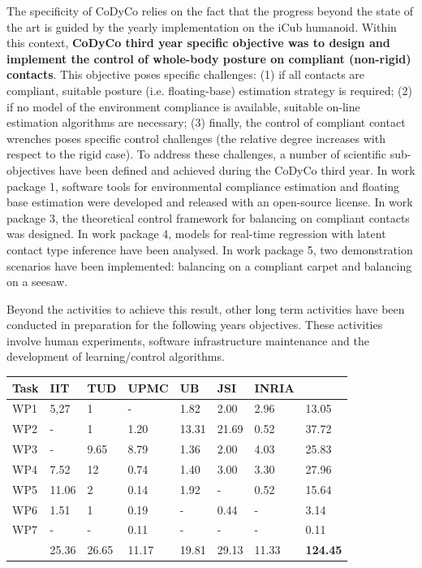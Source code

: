 \documentclass[12pt,a4paper,twoside]{article}
\begin{document}
The specificity of CoDyCo relies on the fact that the progress beyond the state of the art is guided by the yearly implementation on the iCub humanoid. Within this context, \textbf{CoDyCo third year specific objective was to design and implement the control of whole-body posture on compliant (non-rigid) contacts}. This objective poses specific challenges: (1) if all contacts are compliant, suitable posture (i.e. floating-base) estimation strategy is required; (2) if no model of the environment compliance is available, suitable on-line estimation algorithms are necessary; (3) finally, the control of compliant contact wrenches poses specific control challenges (the relative degree increases with respect to the rigid case). To address these challenges, a number of scientific sub-objectives have been defined and achieved during the CoDyCo third year. In work package 1, software tools for environmental compliance estimation and floating base estimation were developed and released with an open-source license. In work package 3, the theoretical control framework for balancing on compliant contacts was designed. In work package 4, models for real-time regression with latent contact type inference have been analysed. In work package 5, two demonstration scenarios have been implemented: balancing on a compliant carpet and balancing on a seesaw. 

Beyond the activities to achieve this result, other long term activities have been conducted in preparation for the following years objectives. These activities involve human experiments, software infrastructure maintenance and the development of learning/control algorithms.

\begin{longtable}{|C{1.5cm}|C{1.5cm}|C{1.5cm}|C{1.5cm}|C{1.5cm}|C{1.5cm}|C{1.5cm}|C{1.5cm}|}
\footnotesize \textbf{Task}& \footnotesize \textbf{IIT}&\footnotesize \textbf{TUD}&\footnotesize \textbf{UPMC}& \footnotesize \textbf{UB} &\footnotesize \textbf{JSI} &\footnotesize \textbf{INRIA} &  \\ \hline
\footnotesize WP1      &  5,27     &  1      &  -      &  1.82   &  2.00  &  2.96  &  13.05\\  \hline
\footnotesize WP2      &  -        &  1      &  1.20   &  13.31  &  21.69 &  0.52  &  37.72\\  \hline
\footnotesize WP3      &  -        &  9.65   &  8.79   &  1.36   &  2.00  &  4.03  &  25.83\\  \hline
\footnotesize WP4      &  7.52     &  12     &  0.74   &  1.40   &  3.00  &  3.30  &  27.96\\  \hline
\footnotesize WP5      &  11.06    &  2      &  0.14   &  1.92   &  -     &  0.52  &  15.64\\  \hline
\footnotesize WP6      &  1.51     &  1      &  0.19   &  -      &  0.44  &  -     &   3.14\\  \hline
\footnotesize WP7      &  -        &  -      &  0.11   &  -      &  -     &  -     &   0.11\\  \hline
{}  &  25.36    &  26.65  &  11.17  &  19.81  &  29.13 &  11.33 &  \textbf{124.45}     \\  
\end{longtable}
\end{document}
